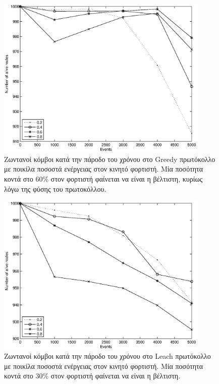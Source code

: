 \begin{figure}[H]
  \centering
  \includegraphics[width=0.9\textwidth]{experiments/classic/3.smallVSbigpercentage/alive_nodes_greedy_rc_per_our.eps}
  \caption{Ζωντανοί κόμβοι κατά την πάροδο του χρόνου στο Greedy πρωτόκολλο με ποικίλα ποσοστά ενέργειας στον κινητό φορτιστή. Μία ποσότητα κοντά στο 60\% στον
φορτιστή φαίνεται να είναι η βέλτιστη, κυρίως λόγω της φύσης του πρωτοκόλλου.}
  \label{fig:3exp_1_1}
\end{figure}

\begin{figure}[H]
  \centering
   \includegraphics[width=0.9\textwidth]{experiments/classic/3.smallVSbigpercentage/alive_nodes_leach_rc_per_our.eps}
  \caption{Ζωντανοί κόμβοι κατά την πάροδο του χρόνου στο Leach πρωτόκολλο με ποικίλα ποσοστά ενέργειας στον κινητό φορτιστή. Μία ποσότητα κοντά στο 30\% στον
φορτιστή φαίνεται να είναι η βέλτιστη.}
  \label{fig:3exp_1_2}
\end{figure}

